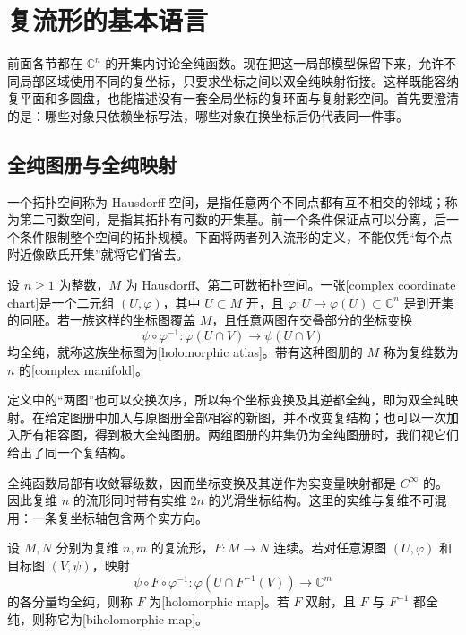 \section{复流形的基本语言}
\label{b3:sec:2907}

前面各节都在 \(\mathbb C^n\) 的开集内讨论全纯函数。现在把这一局部模型保留下来，允许不同局部区域使用不同的复坐标，只要求坐标之间以双全纯映射衔接。这样既能容纳复平面和多圆盘，也能描述没有一套全局坐标的复环面与复射影空间。首先要澄清的是：哪些对象只依赖坐标写法，哪些对象在换坐标后仍代表同一件事。

\subsection{全纯图册与全纯映射}
\label{b3:subsec:290701}

一个拓扑空间称为 Hausdorff 空间，是指任意两个不同点都有互不相交的邻域；称为第二可数空间，是指其拓扑有可数的开集基。前一个条件保证点可以分离，后一个条件限制整个空间的拓扑规模。下面将两者列入流形的定义，不能仅凭“每个点附近像欧氏开集”就将它们省去。

\begin{definition}[复图册与复流形]\label{b3:def:29-complex-atlas}
设 \(n\ge1\) 为整数，\(M\) 为 Hausdorff、第二可数拓扑空间。一张[complex coordinate chart]是一个二元组 \((U,\varphi)\)，其中 \(U\subset M\) 开，且 \(\varphi:U\to\varphi(U)\subset\mathbb C^n\) 是到开集的同胚。若一族这样的坐标图覆盖 \(M\)，且任意两图在交叠部分的坐标变换
\[
 \psi\circ\varphi^{-1}:
 \varphi(U\cap V)\longrightarrow\psi(U\cap V)
\]
均全纯，就称这族坐标图为[holomorphic atlas]。带有这种图册的 \(M\) 称为复维数为 \(n\) 的[complex manifold]。
\end{definition}

定义中的“两图”也可以交换次序，所以每个坐标变换及其逆都全纯，即为双全纯映射。在给定图册中加入与原图册全部相容的新图，并不改变复结构；也可以一次加入所有相容图，得到极大全纯图册。两组图册的并集仍为全纯图册时，我们视它们给出了同一个复结构。

\ProseParagraphBreak

全纯函数局部有收敛幂级数，因而坐标变换及其逆作为实变量映射都是 \(C^\infty\) 的。因此复维 \(n\) 的流形同时带有实维 \(2n\) 的光滑坐标结构。这里的实维与复维不可混用：一条复坐标轴包含两个实方向。

\begin{definition}[复流形之间的全纯映射]\label{b3:def:29-holomorphic-map}
设 \(M,N\) 分别为复维 \(n,m\) 的复流形，\(F:M\to N\) 连续。若对任意源图 \((U,\varphi)\) 和目标图 \((V,\psi)\)，映射
\[
 \psi\circ F\circ\varphi^{-1}:
 \varphi(U\cap F^{-1}(V))\longrightarrow\mathbb C^m
\]
的各分量均全纯，则称 \(F\) 为[holomorphic map]。若 \(F\) 双射，且 \(F\) 与 \(F^{-1}\) 都全纯，则称它为[biholomorphic map]。
\end{definition}

